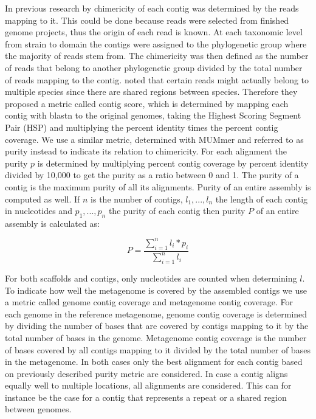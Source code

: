 \documentclass[a4paper,12pt]{article}
\begin{document}
In previous research by \citet{Mavromatis17468765} chimericity of
each contig was determined by the reads mapping to it. This could be done
because reads were selected from finished genome projects, thus 
the origin of each read is known. At each taxonomic level from strain to domain the
contigs were assigned to the phylogenetic group where the majority of reads
stem from. The chimericity was then defined as the number of
reads that belong to another phylogenetic group divided by the total number of
reads mapping to the contig.  \citet{Mende22384016} noted that certain
reads might actually belong to multiple species since there are shared regions between species.
Therefore they proposed a metric called contig score, which is determined by mapping
each contig with blastn to the original genomes, taking the Highest Scoring
Segment Pair (HSP) and multiplying the percent identity times the percent
contig coverage. We use a similar metric, determined with MUMmer
and referred to as purity instead to indicate its relation to chimericity. For
each alignment the purity $p$ is determined by multiplying percent contig
coverage by percent identity divided by 10,000 to get the purity as a ratio
between 0 and 1. The purity of a contig is the maximum purity of all its
alignments. Purity of an entire assembly is computed as well. If $n$ is the
number of contigs, $l_1,...,l_n$ the length of each contig in nucleotides and
$p_1,...,p_n$ the purity of each contig then purity $P$ of an entire
assembly is calculated as:

\begin{equation}
P = \frac{\sum_{i=1}^n l_{i} * p_{i}}{\sum_{i=1}^{n} l_{i}}
\end{equation}

For both scaffolds and contigs, only nucleotides are counted when determining
$l$.\\


To indicate how well the metagenome is covered by the assembled contigs we use
a metric called genome contig coverage and metagenome contig coverage. For each
genome in the reference metagenome, genome contig coverage is determined by
dividing the number of bases that are covered by contigs mapping to it by the
total number of bases in the genome. Metagenome contig coverage is the number
of bases covered by all contigs mapping to it divided by the total number of
bases in the metagenome. In both cases only the best alignment for each contig
based on previously described purity metric are considered. In case a contig
aligns equally well to multiple locations, all alignments are considered. This
can for instance be the case for a contig that represents a repeat or a shared
region between genomes.
\end{document}
